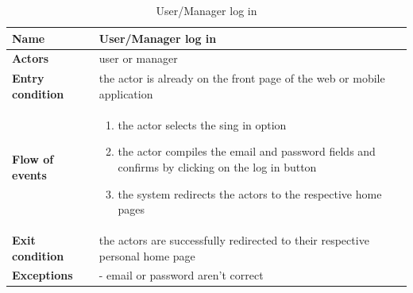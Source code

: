 \begin{table}[h!]
    \centering
    \begin{tabular}{@{}P{0.2\textwidth}P{0.70\textwidth}@{}}
        \toprule
        \textbf{Name}                 & User/Manager log in\\
        \midrule
        \textbf{Actors}               & user or manager\\
        \textbf{Entry condition}      & the actor is already on the front page of the web or mobile application\\
        \textbf{Flow of events}       & 
        \begin{enumerate}[nolistsep, leftmargin=*]
            \item the actor selects the sing in option
            \item the actor compiles the email and password fields and confirms by clicking on the log in button 
            \item the system redirects the actors to the respective home pages
        \end{enumerate} \\
        \textbf{Exit condition}       & the actors are successfully redirected to their respective personal home page\\
        \textbf{Exceptions}           
        & - email or password aren’t correct \\
        \bottomrule
    \end{tabular}
\caption{User/Manager log in}
\label{table:login}
\end{table}


